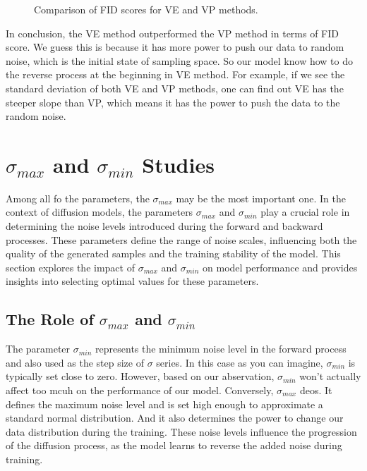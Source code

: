\begin{figure}[h!]
    \centering
    \caption{Comparison of FID scores for VE and VP methods.}
\end{figure}

In conclusion, the VE method outperformed the VP method in terms of FID score. 
We guess this is because it has more power to push our data to random noise, which is the initial state of sampling space. So our model know how to do the reverse process at the beginning in VE method. For example, if we see the standard deviation of both VE and VP methods, one can find out VE has the steeper slope than VP, which means it has the power to push the data to the random noise.

\section{$\sigma_{max}$ and $\sigma_{min}$ Studies}

Among all fo the parameters, the $\sigma_{max}$ may be the most important one. In the context of diffusion models, the parameters $\sigma_{max}$ and $\sigma_{min}$ play a crucial role in determining the noise levels introduced during the forward and backward processes. These parameters define the range of noise scales, influencing both the quality of the generated samples and the training stability of the model. This section explores the impact of $\sigma_{max}$ and $\sigma_{min}$ on model performance and provides insights into selecting optimal values for these parameters.

\subsection{The Role of $\sigma_{max}$ and $\sigma_{min}$}

The parameter $\sigma_{min}$ represents the minimum noise level in the forward process and also used as the step size of $\sigma$ series. In this case as you can imagine, $\sigma_{min}$ is typically set close to zero. However, based on our abservation, $\sigma_{min}$ won't actually affect too mcuh on the performance of our model. Conversely, $\sigma_{max}$ deos. It defines the maximum noise level and is set high enough to approximate a standard normal distribution. And it also determines the power to change our data distribution during the training. These noise levels influence the progression of the diffusion process, as the model learns to reverse the added noise during training.

